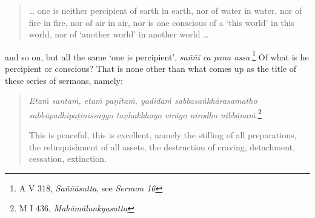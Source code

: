 \begin{quote}
\ldots{} one is neither percipient of earth in earth, nor of water in water, nor of fire in fire, nor of air in air, nor is one conscious of a `this world' in this world, nor of `another world' in another world \ldots{}
\end{quote}

and so on, but all the same `one is percipient', \emph{saññī ca pana assa.}\footnote{A V 318, \emph{Saññāsutta}, see \emph{Sermon 16}} Of what is he percipient or conscious? That is none other than what comes up as the title of these series of sermons, namely:

\begin{quote}
\emph{Etaṁ santaṁ, etaṁ paṇītaṁ, yadidaṁ sabbasaṅkhārasamatho sabbūpadhipaṭinissaggo taṇhakkhayo virāgo nirodho nibbānaṁ.}\footnote{M I 436, \emph{Mahāmālunkyasutta}}

This is peaceful, this is excellent, namely the stilling of all preparations, the relinquishment of all assets, the destruction of craving, detachment, cessation, extinction.
\end{quote}
